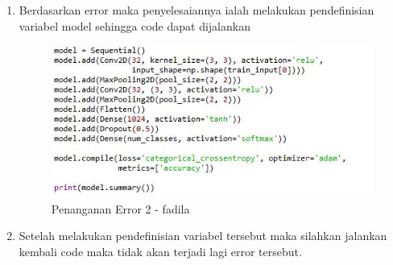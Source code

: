 \begin{enumerate}
\begin{itemize}
\begin{enumerate}
\item Berdasarkan error maka penyelesaiannya ialah melakukan pendefinisian variabel model sehingga code dapat dijalankan
\par
\begin{figure}[!hbtp]
\centering
\includegraphics[scale=0.2]{figures/chapter-7-penanganan-error-2-fadila.jpg}
\caption{Penanganan Error 2 - fadila}
\label{chapter-7-penanganan-error-2-fadila}
\end{figure}
\par
\item Setelah melakukan pendefinisian variabel tersebut maka silahkan jalankan kembali code maka tidak akan terjadi lagi error tersebut.
\end{enumerate}
\end{itemize}
\end{enumerate}
\par
\par